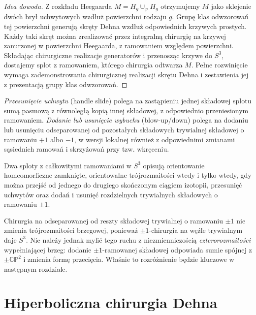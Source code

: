 \begin{proof}[Idea dowodu]
Z rozkładu Heegaarda $M=H_g\cup_\varphi H_g$ otrzymujemy
$M$ jako sklejenie dwóch brył uchwytowych wzdłuż
powierzchni rodzaju $g$. Grupę klas odwzorowań tej
powierzchni generują skręty Dehna wzdłuż odpowiednich
krzywych prostych. Każdy taki skręt można zrealizować
przez integralną chirurgię na krzywej zanurzonej
w powierzchni Heegaarda, z ramowaniem względem powierzchni.
Składając chirurgiczne realizacje generatorów i przenosząc
krzywe do $S^3$, dostajemy splot z ramowaniem, którego
chirurgia odtwarza $M$. Pełne rozwinięcie wymaga
zademonstrowania chirurgicznej realizacji skrętu Dehna
i zestawienia jej z prezentacją grupy klas odwzorowań.
\end{proof}

\begin{definicja}
\emph{Przesunięcie uchwytu} (handle slide) polega na zastąpieniu
jednej składowej splotu sumą pasmową z równoległą kopią
innej składowej, z odpowiednio przeniesionym ramowaniem.
\emph{Dodanie lub usunięcie wybuchu} (blow-up/down)
polega na dodaniu lub usunięciu odseparowanej od pozostałych
składowych trywialnej składowej o ramowaniu $+1$ albo $-1$,
w wersji lokalnej również z odpowiednimi zmianami sąsiednich
ramowań i skrzyżowań przy tzw. wkręceniu.
\end{definicja}

\begin{twierdzenie}
Dwa sploty z całkowitymi ramowaniami w $S^3$ opisują
orientowanie homeomorficzne zamknięte, orientowalne
trójrozmaitości wtedy i tylko wtedy, gdy można przejść
od jednego do drugiego skończonym ciągiem izotopii,
przesunięć uchwytów oraz dodań i usunięć rozdzielnych
trywialnych składowych o ramowaniu $\pm1$.
\end{twierdzenie}

\begin{uwaga}
Chirurgia na odseparowanej od reszty składowej trywialnej
o ramowaniu $\pm1$ nie zmienia trójrozmaitości brzegowej,
ponieważ $\pm1$-chirurgia na węźle trywialnym daje $S^3$.
Nie należy jednak mylić tego ruchu z niezmienniczością
\emph{czterorozmaitości} wypełniającej brzeg: dodanie
$\pm1$-ramowanej składowej odpowiada sumie spójnej
z $\pm\mathbb{CP}^2$ i zmienia formę przecięcia.
Właśnie to rozróżnienie będzie kluczowe w następnym rozdziale.
\end{uwaga}

\section{Hiperboliczna chirurgia Dehna}
\label{sec:kt-hyper-dehn}

